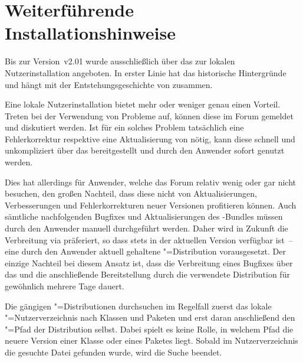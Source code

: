 \chapter{Weiterführende Installationshinweise}
\label{sec:install:ext}
%
Bis zur Version~v2.01 wurde \TUDScript ausschließlich über das \Forum zur 
lokalen Nutzerinstallation angeboten. In erster Linie hat das historische 
Hintergründe und hängt mit der Entstehungsgeschichte von \TUDScript zusammen. 

Eine lokale Nutzerinstallation bietet mehr oder weniger genau einen Vorteil. 
Treten bei der Verwendung von \TUDScript Probleme auf, können diese im Forum 
gemeldet und diskutiert werden. Ist für ein solches Problem tatsächlich eine 
Fehlerkorrektur respektive eine Aktualisierung von \TUDScript nötig, kann 
diese schnell und unkompliziert über das 
bereitgestellt und durch den Anwender sofort genutzt werden.

Dies hat allerdings für Anwender, welche das Forum relativ wenig oder gar 
nicht besuchen, den großen Nachteil, dass diese nicht von Aktualisierungen, 
Verbesserungen und Fehlerkorrekturen neuer Versionen profitieren können. Auch 
sämtliche nachfolgenden Bugfixes und Aktualisierungen des \TUDScript-Bundles 
müssen durch den Anwender manuell durchgeführt werden. Daher wird in Zukunft 
die Verbreitung via  präferiert, so 
dass \TUDScript stets in der aktuellen Version verfügbar ist~-- eine durch den 
Anwender aktuell gehaltene "=Distribution vorausgesetzt. Der 
einzige Nachteil bei diesem Ansatz ist, dass die Verbreitung eines Bugfixes 
über das  
und die anschließende Bereitstellung durch die verwendete Distribution für 
gewöhnlich mehrere Tage dauert.

Die gängigen "=Distributionen durchsuchen im Regelfall zuerst das 
lokale "=Nutzerverzeichnis nach Klassen und Paketen und erst daran 
anschließend den "=Pfad der Distribution selbst. Dabei spielt es 
keine Rolle, in welchem Pfad die neuere Version einer Klasse oder eines Paketes 
liegt. Sobald im Nutzerverzeichnis die gesuchte Datei gefunden wurde, wird die 
Suche beendet.


